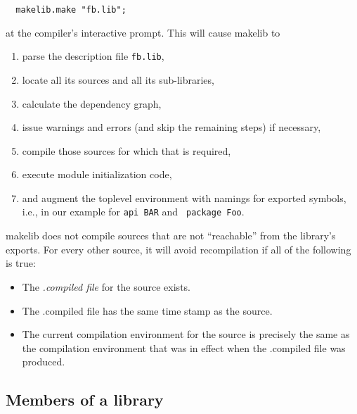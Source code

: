 \begin{verbatim}
  makelib.make "fb.lib";
\end{verbatim}

at the compiler's interactive prompt.  This will cause makelib to

\begin{enumerate}
\item parse the description file {\tt fb.lib},
\item locate all its sources and all its sub-libraries,
\item calculate the dependency graph,
\item issue warnings and errors (and skip the remaining steps) if
necessary,
\item compile those sources for which that is required,
\item execute module initialization code,
\item and augment the toplevel environment with namings for exported
symbols, i.e., in our example for {\tt api BAR} and {\tt
package Foo}.
\end{enumerate}

makelib does not compile sources that are not ``reachable'' from the
library's exports.  For every other source, it will avoid
recompilation if all of the following is true:

\begin{itemize}
\item The {\em .compiled file} for the source exists.
\item The .compiled file has the same time stamp as the source.
\item The current compilation environment for the source is precisely
the same as the compilation environment that was in effect when the
.compiled file was produced.
\end{itemize}

\subsection{Members of a library}

